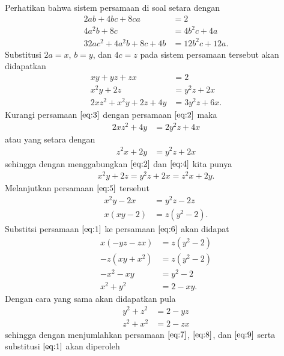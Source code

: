 \begin{jawaban} Perhatikan bahwa sistem persamaan di soal setara dengan
\begin{align*}
    2ab+4bc+8ca&=2\\
    4a^2b+8c&=4b^2c+4a\\
    32ac^2+4a^2b+8c+4b &= 12b^2c+12a.
\end{align*}
Substitusi $2a=x$, $b=y$, dan $4c=z$ pada sistem persamaan tersebut akan didapatkan
\begin{align}
    xy+yz+zx &= 2\label{eq:1}\\
    x^2y+2z &= y^2 z+2x\label{eq:2}\\
    2xz^2+x^2y+2z+4y &= 3y^2z + 6x.\label{eq:3}
\end{align}
Kurangi persamaan $\eqref{eq:3}$ dengan persamaan $\eqref{eq:2}$ maka
\begin{align*}
    2xz^2+4y &= 2y^2z + 4x
\end{align*}
atau yang setara dengan
\begin{align}
    z^2x+2y &= y^2z + 2x\label{eq:4}
\end{align}
sehingga dengan menggabungkan $\eqref{eq:2}$ dan $\eqref{eq:4}$ kita punya
\begin{align}
    x^2y+2z = y^2z + 2x =z^2x+2y.\label{eq:5}
\end{align}
Melanjutkan persamaan $\eqref{eq:5}$ tersebut
\begin{align}
    x^2y-2x &= y^2z-2z \nonumber \\
    x(xy-2) &= z(y^2-2).\label{eq:6}
\end{align}
Substitsi persamaan $\eqref{eq:1}$ ke persamaan $\eqref{eq:6}$ akan didapat 
\begin{align}
    x(-yz-zx) &= z(y^2-2)\nonumber\\
    -z(xy+x^2) &= z(y^2-2)\nonumber\\
    -x^2-xy &= y^2-2\nonumber\\
    x^2+y^2 &= 2-xy. \label{eq:7}
\end{align}
Dengan cara yang sama akan didapatkan pula
\begin{align}
    y^2+z^2 &= 2-yz \label{eq:8}\\
    z^2+x^2 &= 2-zx \label{eq:9}
\end{align}
sehingga dengan menjumlahkan persamaan $\eqref{eq:7}$, $\eqref{eq:8}$, dan $\eqref{eq:9}$ serta substitusi $\eqref{eq:1}$ akan diperoleh


\end{jawaban}
